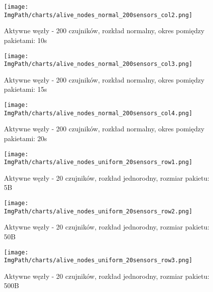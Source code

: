 \documentclass[a4paper,12pt,twoside,openany]{report}
\newcommand{\ImgPath}{./img}
\begin{document}
\begin{figure}[H]
	\begin{center}
		\texttt{[image: \\ImgPath/charts/alive\_nodes\_normal\_200sensors\_col2.png]}
	\end{center}
	\caption{Aktywne węzły - 200 czujników, rozkład normalny, okres pomiędzy pakietami: 10s}
\end{figure}

\begin{figure}[H]
	\begin{center}
		\texttt{[image: \\ImgPath/charts/alive\_nodes\_normal\_200sensors\_col3.png]}
	\end{center}
	\caption{Aktywne węzły - 200 czujników, rozkład normalny, okres pomiędzy pakietami: 15s}
\end{figure}

\begin{figure}[H]
	\begin{center}
		\texttt{[image: \\ImgPath/charts/alive\_nodes\_normal\_200sensors\_col4.png]}
	\end{center}
	\caption{Aktywne węzły - 200 czujników, rozkład normalny, okres pomiędzy pakietami: 20s}
\end{figure}

\begin{figure}[H]
	\begin{center}
		\texttt{[image: \\ImgPath/charts/alive\_nodes\_uniform\_20sensors\_row1.png]}
	\end{center}
	\caption{Aktywne węzły - 20 czujników, rozkład jednorodny, rozmiar pakietu: 5B}
\end{figure}

\begin{figure}[H]
	\begin{center}
		\texttt{[image: \\ImgPath/charts/alive\_nodes\_uniform\_20sensors\_row2.png]}
	\end{center}
	\caption{Aktywne węzły - 20 czujników, rozkład jednorodny, rozmiar pakietu: 50B}
\end{figure}

\begin{figure}[H]
	\begin{center}
		\texttt{[image: \\ImgPath/charts/alive\_nodes\_uniform\_20sensors\_row3.png]}
	\end{center}
	\caption{Aktywne węzły - 20 czujników, rozkład jednorodny, rozmiar pakietu: 500B}
\end{figure}
\end{document}
